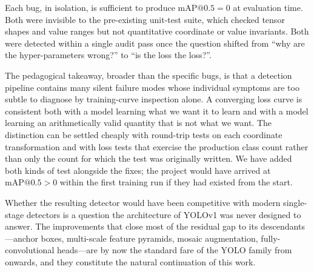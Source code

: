 \noindent Each bug, in isolation, is sufficient to produce
$\mathrm{mAP}@0.5 = 0$ at evaluation time. Both were invisible to the
pre-existing unit-test suite, which checked tensor shapes and value ranges
but not quantitative coordinate or value invariants. Both were detected
within a single audit pass once the question shifted from
``why are the hyper-parameters wrong?'' to ``is the loss the loss?''.

The pedagogical takeaway, broader than the specific bugs, is that a
detection pipeline contains many silent failure modes whose individual
symptoms are too subtle to diagnose by training-curve inspection alone.
A converging loss curve is consistent both with a model learning what we
want it to learn and with a model learning an arithmetically valid quantity
that is not what we want. The distinction can be settled cheaply with
round-trip tests on each coordinate transformation and with loss tests that
exercise the production class count rather than only the count for which
the test was originally written. We have added both kinds of test alongside
the fixes; the project would have arrived at $\mathrm{mAP}@0.5 > 0$ within
the first training run if they had existed from the start.

Whether the resulting detector would have been competitive with modern
single-stage detectors is a question the architecture of YOLOv1 was never
designed to answer. The improvements that close most of the residual gap to
its descendants---anchor boxes, multi-scale feature pyramids, mosaic
augmentation, fully-convolutional heads---are by now the standard fare of
the YOLO family from \citet{redmon2018yolov3} onwards, and they constitute
the natural continuation of this work.
